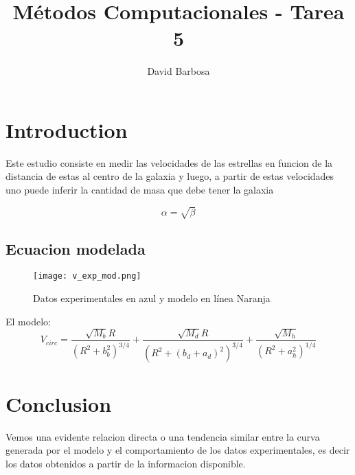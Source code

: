 \documentclass{article}
\begin{document}
\title{Métodos Computacionales - Tarea 5}
\author{David Barbosa}

\maketitle


\section{Introduction}
Este estudio consiste en medir las velocidades de las estrellas en funcion de la distancia de estas al centro de la galaxia y luego, a partir de estas velocidades uno puede inferir la cantidad de masa que debe tener la galaxia

\begin{equation}
    \label{simple_equation}
    \alpha = \sqrt{ \beta }
\end{equation}

\subsection{Ecuacion modelada}




\begin{figure}
    \centering
    \texttt{[image: v\_exp\_mod.png]}
    \caption{Datos experimentales en azul y modelo en línea Naranja}
    \label{fig:exp_vs_mod}
\end{figure}

El modelo:
$$ V_{circ} = \frac{\sqrt{M_b}R}{(R^2+b_b^2)^{3/4}} + 
\frac{\sqrt{M_d}R}{(R^2+(b_d+a_d)^2)^{3/4}} +
\frac{\sqrt{M_h}}{(R^2+a_h^2)^{1/4}} $$

\section{Conclusion}
Vemos una evidente relacion directa o una tendencia similar entre la curva generada por el modelo y el comportamiento de los datos experimentales, es decir los datos obtenidos a partir de la informacion disponible.
\end{document}

